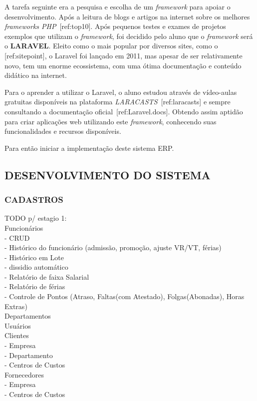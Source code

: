 \documentclass[
  12pt,				%
  openany,
  oneside,
  a4paper,			%
  english,			%
  brazil
]{article}
\numberwithin{figure}{section}
\numberwithin{table}{section}
\begin{document}
A tarefa seguinte era a pesquisa e escolha de um \textit{framework} para apoiar o desenvolvimento. Após a leitura de blogs e artigos na internet sobre os melhores \textit{frameworks PHP}~[ref:top10]. Após pequenos testes e exames de projetos exemplos que utilizam o \textit{framework}, foi decidido pelo aluno que o \textit{framework} será o \textbf{LARAVEL}. Eleito como o mais popular por diversos sites, como o [ref:sitepoint], o Laravel foi lançado em 2011, mas apesar de ser relativamente novo, tem um enorme ecossistema, com uma ótima documentação e conteúdo didático na internet.

Para o aprender a utilizar o Laravel, o aluno estudou através de vídeo-aulas gratuitas disponíveis na plataforma \textit{LARACASTS}~[ref:laracasts] e sempre consultando a documentação oficial~[ref:Laravel.docs]. Obtendo assim aptidão para criar aplicações web utilizando este \textit{framework}, conhecendo suas funcionalidades e recursos disponíveis.

Para então iniciar a implementação deste sistema ERP.




\subsection{DESENVOLVIMENTO DO SISTEMA} 

  \subsubsection{CADASTROS}
  
  \noindent TODO p/ estagio 1: \\
  Funcionários \\
  - CRUD \\
  - Histórico do funcionário (admissão, promoção, ajuste VR/VT, férias)\\
  - Histórico em Lote\\
  - dissidio automático \\
  - Relatório de faixa Salarial \\
  - Relatório de férias \\
  - Controle de Pontos (Atraso, Faltas(com Atestado), Folgas(Abonadas), Horas Extras) \\
  Departamentos \\
  Usuários \\
  Clientes \\
  - Empresa \\
  - Departamento \\
  - Centros de Custos \\
  Fornecedores \\
  - Empresa \\
  - Centros de Custos 
\end{document}
